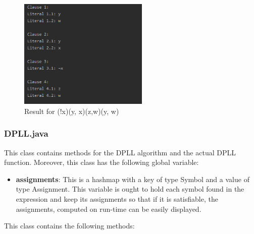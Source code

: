 \documentclass{article}
\begin{document}
\begin{enumerate}
						\begin{figure}[H]
					\centering
			 			\includegraphics[width=0.55\textwidth]{printparsed.png}
			 			\centering
			  			\caption{Result for (!x)(y, x)(z,w)(y, w)}
			  			\label{fig:printparsed}
					\end{figure}
					
		
		\end{enumerate}
		
				\subsubsection{DPLL.java}
				
				This class contains methods for the DPLL algorithm and the actual DPLL function. 
				Moreover, this class has the following global variable:
		
		\begin{itemize}
		\item \textbf{assignments}: This is a hashmap with a key of type Symbol and a value of type Assignment. This variable is ought to hold each symbol found in the expression and keep its assignments so that if it is satisfiable, the assignments, computed on run-time can be easily displayed.
		\end{itemize}
				
	This class contains the following methods:
	
\end{document}
